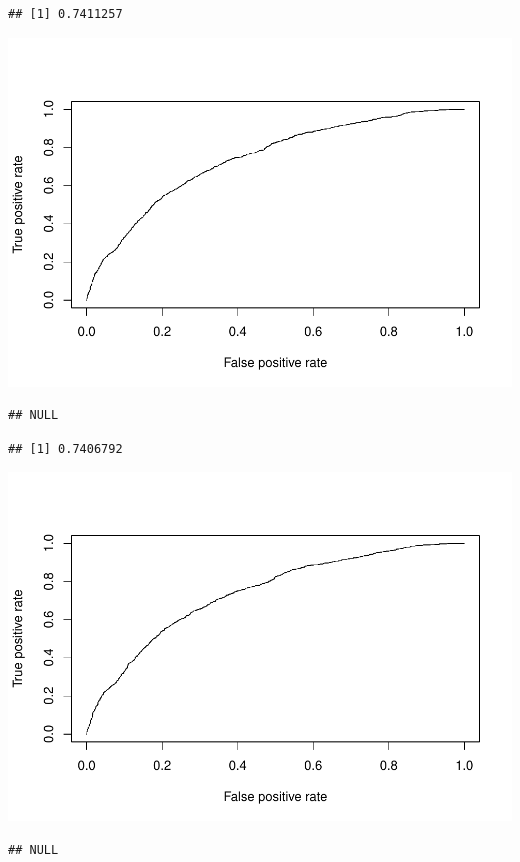 \documentclass[]{article}
\begin{document}
\begin{verbatim}
## [1] 0.7411257
\end{verbatim}

\includegraphics{DATA621-Homework-4_files/figure-latex/unnamed-chunk-34-2.pdf}

\begin{verbatim}
## NULL
\end{verbatim}

\begin{verbatim}
## [1] 0.7406792
\end{verbatim}

\includegraphics{DATA621-Homework-4_files/figure-latex/unnamed-chunk-34-3.pdf}

\begin{verbatim}
## NULL
\end{verbatim}
\end{document}
